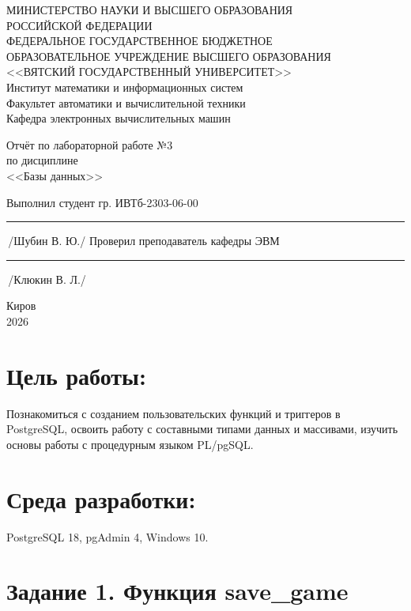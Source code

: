\documentclass[oneside,a4paper,14pt]{extarticle}
\begin{document}
	\newpage\thispagestyle{empty}
	\begin{center}
		МИНИСТЕРСТВО НАУКИ И ВЫСШЕГО ОБРАЗОВАНИЯ\\
		РОССИЙСКОЙ ФЕДЕРАЦИИ\\
		ФЕДЕРАЛЬНОЕ ГОСУДАРСТВЕННОЕ БЮДЖЕТНОЕ\\
		ОБРАЗОВАТЕЛЬНОЕ УЧРЕЖДЕНИЕ ВЫСШЕГО ОБРАЗОВАНИЯ\\
		<<ВЯТСКИЙ ГОСУДАРСТВЕННЫЙ УНИВЕРСИТЕТ>>\\
		Институт математики и информационных систем\\
		Факультет автоматики и вычислительной техники\\
		Кафедра электронных вычислительных машин
	\end{center}
	\vspace{20mm}
	\begin{center}
		Отчёт по лабораторной работе №3\\
		по дисциплине\\
		<<Базы данных>>\\
	\end{center}
	\vspace{48mm}
	\noindent
	Выполнил студент гр. ИВТб-2303-06-00 \hfill \rule[-0,5mm]{30mm}{0.15mm}\,/Шубин В. Ю./
	\newline
	Проверил преподаватель кафедры ЭВМ \hfill \rule[-0,5mm]{30mm}{0.15mm}\,/Клюкин В. Л./
	\vfill
	\begin{center}
		Киров\\
		2026
	\end{center}
	\newpage
	\thispagestyle{empty}
	\section*{Цель работы:} Познакомиться с созданием пользовательских функций и триггеров в PostgreSQL, освоить работу с составными типами данных и массивами, изучить основы работы с процедурным языком PL/pgSQL.
	
	\section*{Среда разработки:} PostgreSQL 18, pgAdmin 4, Windows 10.
	
	\newpage
	
	\section*{Задание 1. Функция save\_game}
	
\end{document}
